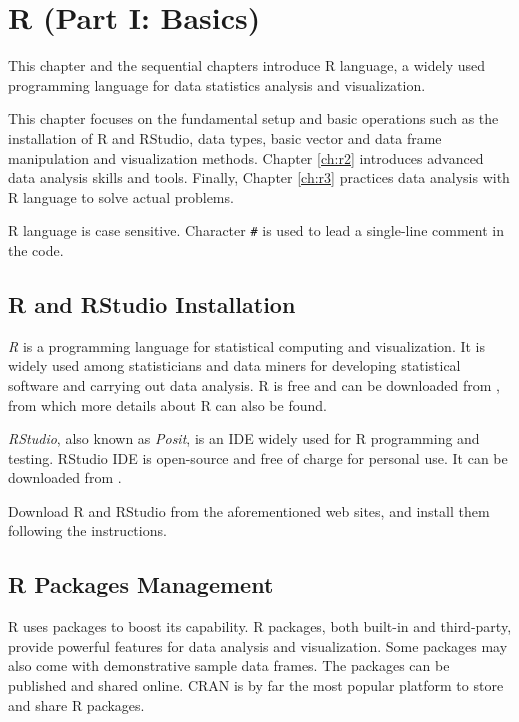 \chapter{R (Part I: Basics)} \label{ch:r1}

This chapter and the sequential chapters introduce R language, a widely used programming language for data statistics analysis and visualization. 

This chapter focuses on the fundamental setup and basic operations such as the installation of R and RStudio, data types, basic vector and data frame manipulation and visualization methods. Chapter \ref{ch:r2} introduces advanced data analysis skills and tools. Finally, Chapter \ref{ch:r3} practices data analysis with R language to solve actual problems.

R language is case sensitive. Character \verb|#| is used to lead a single-line comment in the code.

\section{R and RStudio Installation} \label{ch:r1:sec:rinstallation}

\textit{R} is a programming language for statistical computing and visualization. It is widely used among statisticians and data miners for developing statistical software and carrying out data analysis. R is free and can be downloaded from \cite{r}, from which more details about R can also be found.

\textit{RStudio}, also known as \textit{Posit}, is an IDE widely used for R programming and testing. RStudio IDE is open-source and free of charge for personal use. It can be downloaded from \cite{rstudio}.

Download R and RStudio from the aforementioned web sites, and install them following the instructions.

\section{R Packages Management} \label{ch:r1:sec:rpackage}

R uses packages to boost its capability. R packages, both built-in and third-party, provide powerful features for data analysis and visualization. Some packages may also come with demonstrative sample data frames. The packages can be published and shared online. CRAN is by far the most popular platform to store and share R packages.


